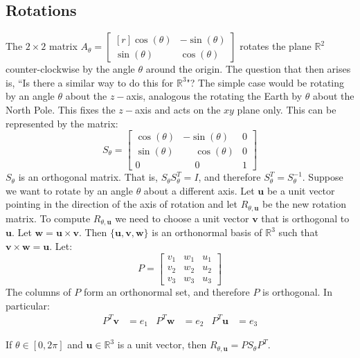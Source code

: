 \documentclass[../main.tex]{subfiles}
\begin{document}
\subsection{Rotations}
%
{
The $2\times 2$ matrix $A_{\theta} = \begin{bmatrix*}[r] \cos(\theta) & -\sin(\theta) \\ \sin(\theta) & \cos(\theta)\end{bmatrix*}$ rotates the plane $\mathbb{R}^2$ counter-clockwise by the angle $\theta$ around the origin. The question that then arises is, ``Is there a similar way to do this for $\mathbb{R}^3$"? The simple case would be rotating by an angle $\theta$ about the $z-$axis, analogous the rotating the Earth by $\theta$ about the North Pole. This fixes the $z-$axis and acts on the $xy$ plane only. This can be represented by the matrix:
}
%
\begin{equation*}
 S_{\theta} = \begin{bmatrix*} \cos(\theta) & -\sin(\theta) & 0 \\ \sin(\theta) & \phantom{-}\cos(\theta) & 0\\ 0 & \phantom{-}0 & 1 \end{bmatrix*}   
\end{equation*}
%
{
$S_{\theta}$ is an orthogonal matrix. That is, $S_{\theta} S_{\theta}^T = I$, and therefore $S_{\theta}^T = S_{\theta}^{-1}$. Suppose we want to rotate by an angle $\theta$ about a different axis. Let $\mathbf{u}$ be a unit vector pointing in the direction of the axis of rotation and let $R_{\theta,\mathbf{u}}$ be the new rotation matrix. To compute $R_{\theta,\mathbf{u}}$ we need to choose a unit vector $\mathbf{v}$ that is orthogonal to $\mathbf{u}$. Let $\mathbf{w} = \mathbf{u}\times \mathbf{v}$. Then $\{\mathbf{u},\mathbf{v},\mathbf{w}\}$ is an orthonormal basis of $\mathbb{R}^3$ such that $\mathbf{v}\times \mathbf{w} = \mathbf{u}$. Let:
}
\begin{equation*}
    P = \begin{bmatrix} v_1 & w_1 & u_1 \\ v_2 & w_2 & u_2 \\ v_3 & w_3 & u_3 \end{bmatrix}
\end{equation*}
The columns of $P$ form an orthonormal set, and therefore $P$ is orthogonal. In particular:
\begin{align*}
    P^{T}\mathbf{v} &= e_{1} & P^{T}\mathbf{w} &= e_{2} & P^{T}\mathbf{u} &= e_{3}
\end{align*}
%
\begin{theorem}
If $\theta \in [0,2\pi]$ and $\mathbf{u}\in \mathbb{R}^3$ is a unit vector, then $R_{\theta, \mathbf{u}} = PS_{\theta}P^T$.
\end{theorem}
\end{document}
